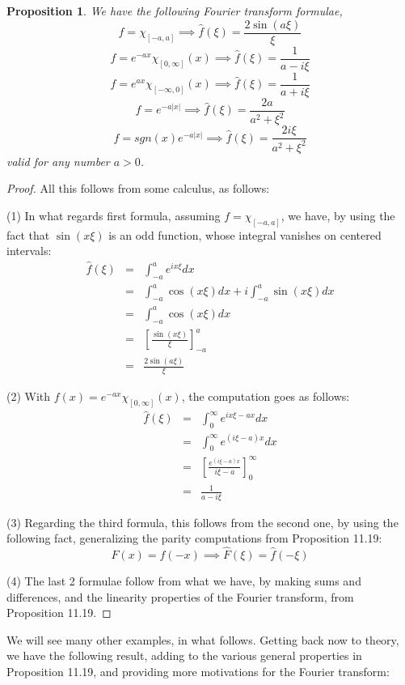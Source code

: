 \documentclass[12pt]{amsbook}
\newtheorem{proposition}[theorem]{Proposition}
\begin{document}
\begin{proposition}
We have the following Fourier transform formulae,
$$f=\chi_{[-a,a]}\implies\widehat{f}(\xi)=\frac{2\sin(a\xi)}{\xi}$$
$$f=e^{-ax}\chi_{[0,\infty]}(x)\implies\widehat{f}(\xi)=\frac{1}{a-i\xi}$$
$$f=e^{ax}\chi_{[-\infty,0]}(x)\implies\widehat{f}(\xi)=\frac{1}{a+i\xi}$$
$$f=e^{-a|x|}\implies\widehat{f}(\xi)=\frac{2a}{a^2+\xi^2}$$
$$f=sgn(x)e^{-a|x|}\implies\widehat{f}(\xi)=\frac{2i\xi}{a^2+\xi^2}$$
valid for any number $a>0$.
\end{proposition}

\begin{proof}
All this follows from some calculus, as follows:

\medskip

(1) In what regards first formula, assuming $f=\chi_{[-a,a]}$, we have, by using the fact that $\sin(x\xi)$ is an odd function, whose integral vanishes on centered intervals:
\begin{eqnarray*}
\widehat{f}(\xi)
&=&\int_{-a}^ae^{ix\xi}dx\\
&=&\int_{-a}^a\cos(x\xi)dx+i\int_{-a}^a\sin(x\xi)dx\\
&=&\int_{-a}^a\cos(x\xi)dx\\
&=&\left[\frac{\sin(x\xi)}{\xi}\right]_{-a}^a\\
&=&\frac{2\sin(a\xi)}{\xi}
\end{eqnarray*}

(2) With $f(x)=e^{-ax}\chi_{[0,\infty]}(x)$, the computation goes as follows:
\begin{eqnarray*}
\widehat{f}(\xi)
&=&\int_0^\infty e^{ix\xi-ax}dx\\
&=&\int_0^\infty e^{(i\xi-a)x}dx\\
&=&\left[\frac{e^{(i\xi-a)x}}{i\xi-a}\right]_0^\infty\\
&=&\frac{1}{a-i\xi}
\end{eqnarray*}

(3) Regarding the third formula, this follows from the second one, by using the following fact, generalizing the parity computations from Proposition 11.19:
$$F(x)=f(-x)\implies\widehat{F}(\xi)=\widehat{f}(-\xi)$$

(4) The last 2 formulae follow from what we have, by making sums and differences, and the linearity properties of the Fourier transform, from Proposition 11.19.
\end{proof}

We will see many other examples, in what follows. Getting back now to theory, we have the following result, adding to the various general properties in Proposition 11.19, and providing more motivations for the Fourier transform:
\end{document}
